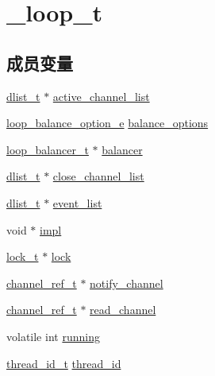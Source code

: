 \hypertarget{struct__loop__t}{}\section{\+\_\+loop\+\_\+t}
\label{struct__loop__t}
\subsection*{成员变量}
\begin{DoxyCompactItemize}
\item 
\hyperlink{config_8h_ad6644d67df4b4e3596c1eb12977d1d16}{dlist\+\_\+t} $\ast$ \hyperlink{struct__loop__t_a66deffb2eaaf50c8a6b832feeecd39e1}{active\+\_\+channel\+\_\+list}
\item 
\hyperlink{config_8h_a6c87150c8f33855c3427c783480fd8ba}{loop\+\_\+balance\+\_\+option\+\_\+e} \hyperlink{struct__loop__t_a5abc8854de864ba27aed98db787118da}{balance\+\_\+options}
\item 
\hyperlink{config_8h_a649c7e850ab247b5f70ad27e335a129d}{loop\+\_\+balancer\+\_\+t} $\ast$ \hyperlink{struct__loop__t_aa2d38510cd70c4c599ab41e3f715b9a5}{balancer}
\item 
\hyperlink{config_8h_ad6644d67df4b4e3596c1eb12977d1d16}{dlist\+\_\+t} $\ast$ \hyperlink{struct__loop__t_aedfc211b821dd460c2e4b15b313f5d62}{close\+\_\+channel\+\_\+list}
\item 
\hyperlink{config_8h_ad6644d67df4b4e3596c1eb12977d1d16}{dlist\+\_\+t} $\ast$ \hyperlink{struct__loop__t_a86104bd04919fe312148e2efcf73a92b}{event\+\_\+list}
\item 
void $\ast$ \hyperlink{struct__loop__t_ad55031c6556322124ec04be72e3244de}{impl}
\item 
\hyperlink{config_8h_ad3e00e0eb0c79dfd77ff2ff833f49c7d}{lock\+\_\+t} $\ast$ \hyperlink{struct__loop__t_abf14bc3bc3eb5e72e92811fcc36b5063}{lock}
\item 
\hyperlink{config_8h_a151271c9d188ef28d4d24bb81dcc1263}{channel\+\_\+ref\+\_\+t} $\ast$ \hyperlink{struct__loop__t_ae77337a149b2612ee5f36834d9a33426}{notify\+\_\+channel}
\item 
\hyperlink{config_8h_a151271c9d188ef28d4d24bb81dcc1263}{channel\+\_\+ref\+\_\+t} $\ast$ \hyperlink{struct__loop__t_ae2b416ad9f757f409c524301c77e4ce7}{read\+\_\+channel}
\item 
volatile int \hyperlink{struct__loop__t_af1f449cc09f8d36befcce07bc38c29c0}{running}
\item 
\hyperlink{config_8h_ad0ada5642d10ce71bdd90816182f9b79}{thread\+\_\+id\+\_\+t} \hyperlink{struct__loop__t_a14d64ca2cf0317cc7821972647eb7b7a}{thread\+\_\+id}
\end{DoxyCompactItemize}


